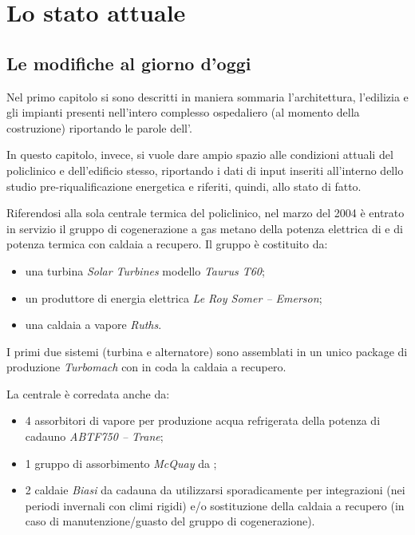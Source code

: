 \chapter{Lo stato attuale}
\thispagestyle{empty}
\section{Le modifiche al giorno d'oggi}
Nel primo capitolo si sono descritti in maniera sommaria l'architettura, l'edilizia e gli impianti presenti nell'intero complesso ospedaliero (al momento della costruzione) riportando le parole dell'. 

In questo capitolo, invece, si vuole dare ampio spazio alle condizioni attuali del policlinico e dell'edificio stesso, riportando i dati di input inseriti all'interno dello studio pre-riqualificazione energetica e riferiti, quindi, allo stato di fatto. 

Riferendosi alla sola centrale termica del policlinico, nel marzo del 2004 è entrato in servizio il gruppo di cogenerazione a gas metano della potenza elettrica di  e  di potenza termica con caldaia a recupero. Il gruppo è costituito da:
\begin{itemize}
	\item una turbina \emph{Solar Turbines} modello \emph{Taurus T60};
	\item un produttore di energia elettrica \emph{Le Roy Somer -- Emerson};
	\item una caldaia a vapore \emph{Ruths}.	
\end{itemize}
I primi due sistemi (turbina e alternatore) sono assemblati in un unico package di produzione \emph{Turbomach} con in coda la caldaia a recupero.

La centrale è corredata anche da:
\begin{itemize}
	\item \num{4} assorbitori di vapore per produzione acqua refrigerata della potenza di  cadauno \emph{ABTF750 -- Trane};
	\item \num{1} gruppo di assorbimento \emph{McQuay} da ;
	\item \num{2} caldaie \emph{Biasi} da  cadauna da utilizzarsi sporadicamente per integrazioni (nei periodi invernali con climi rigidi) e/o sostituzione della caldaia a recupero (in caso di manutenzione/guasto del gruppo di cogenerazione).
\end{itemize}

